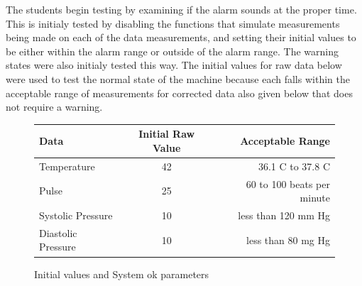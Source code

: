 \documentclass[12pt]{article} %
\begin{document}
The students begin testing by examining if the alarm sounds at the proper time. This is initialy tested by disabling the functions that simulate measurements being made on each of the data measurements, and setting their initial values to be either within the alarm range or outside of the alarm range. The warning states were also initialy tested this way. The initial values for raw data below were used to test the normal state of the machine because each falls within the acceptable range of measurements for corrected data also given below that does not require a warning.
\begin{figure}[h]
	\centering
	\begin{tabular}{|l|c|r|} 
		\hline
		Data & Initial Raw Value & Acceptable Range \\ \hline
		Temperature & 42 & 36.1 C to 37.8 C  \\ \hline
		Pulse & 25 & 60 to 100 beats per minute \\ \hline
		Systolic Pressure  & 10 & less than 120 mm Hg \\ \hline
		Diastolic Pressure & 10 & less than 80 mg Hg	\\ \hline
	\end{tabular}
	\caption{Initial values and System ok parameters\label{tab:testing initil values}}
\end{figure}
	
\end{document}

